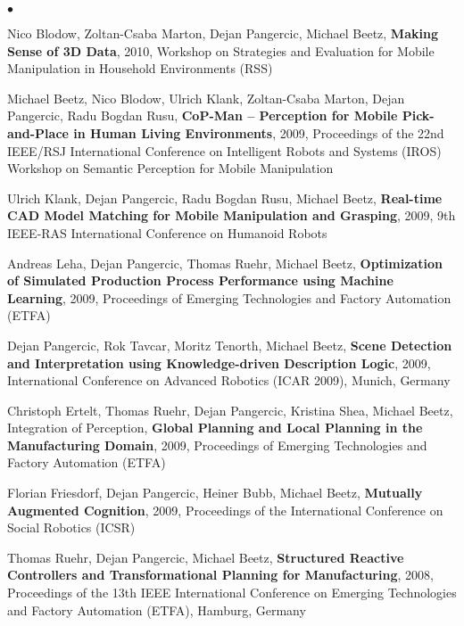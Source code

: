 \documentclass[margin,line]{res}
\newenvironment{list2}{
  \begin{list}{$\bullet$}{%
      \setlength{\itemsep}{0in}
      \setlength{\parsep}{0in} \setlength{\parskip}{0in}
      \setlength{\topsep}{0in} \setlength{\partopsep}{0in} 
      \setlength{\leftmargin}{0.2in}}}{\end{list}}
\begin{document}
\begin{resume}
{\begin{list2}
\item Nico Blodow, Zoltan-Csaba Marton, Dejan Pangercic, Michael Beetz, \textbf{Making Sense of 3D Data}, 2010, Workshop on Strategies and Evaluation for Mobile Manipulation in Household Environments (RSS)\\
\item Michael Beetz, Nico Blodow, Ulrich Klank, Zoltan-Csaba Marton, Dejan Pangercic, Radu Bogdan Rusu, \textbf{CoP-Man -- Perception for Mobile Pick-and-Place in Human Living Environments}, 2009, Proceedings of the 22nd IEEE/RSJ International Conference on Intelligent Robots and Systems (IROS) Workshop on Semantic Perception for Mobile Manipulation\\
\item Ulrich Klank, Dejan Pangercic, Radu Bogdan Rusu, Michael Beetz, \textbf{Real-time CAD Model Matching for Mobile Manipulation and Grasping}, 2009, 9th IEEE-RAS International Conference on Humanoid Robots\\
\item Andreas Leha, Dejan Pangercic, Thomas Ruehr, Michael Beetz, \textbf{Optimization of Simulated Production Process Performance using Machine Learning}, 2009, Proceedings of Emerging Technologies and Factory Automation (ETFA)\\
\item Dejan Pangercic,  Rok Tavcar, Moritz Tenorth, Michael Beetz, \textbf{Scene Detection and Interpretation using Knowledge-driven Description Logic}, 2009, International Conference on Advanced Robotics (ICAR 2009), Munich, Germany \\
\item Christoph Ertelt, Thomas Ruehr, Dejan Pangercic, Kristina Shea, Michael Beetz, Integration of Perception, \textbf{Global Planning and Local Planning in the Manufacturing Domain}, 2009, Proceedings of Emerging Technologies and Factory Automation (ETFA)\\
\item Florian Friesdorf, Dejan Pangercic, Heiner Bubb, Michael Beetz, \textbf{Mutually Augmented Cognition}, 2009, Proceedings of the International Conference on Social Robotics (ICSR)\\
\item Thomas Ruehr,     Dejan Pangercic,     Michael Beetz,     \textbf{Structured Reactive Controllers and Transformational Planning for Manufacturing},   2008,  Proceedings of the 13th IEEE International Conference on Emerging Technologies and Factory Automation (ETFA), Hamburg, Germany\\

\end{list2}}
\end{resume}
\end{document}
